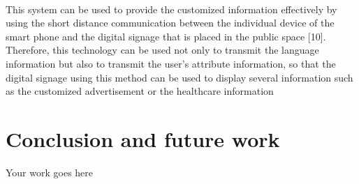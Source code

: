 \documentclass[12pt]{article}
\begin{document}
\paragraph{}This system can be used to provide the customized information effectively by using the short distance communication between the individual device of the smart phone and the digital signage that is placed in the public space [10]. Therefore, this technology can be used not only to transmit the language information but also to transmit the user's attribute information, so that the digital signage using this method can be used to display several information such as the customized advertisement or the healthcare information 

\section{Conclusion and future work}
\label{sect-conclusion}
Your work goes here

\cleardoublepage
{}


\end{document}
